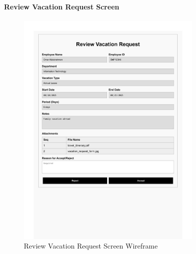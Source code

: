 \documentclass[12pt,a4paper]{article}
\begin{document}
\paragraph{Review Vacation Request Screen}
\begin{figure}[H]
\centering
\includegraphics[width=0.8\textwidth]{Wireframes/Review-Vacation-Request/Review-Vacation-Request-1.png}
\caption{Review Vacation Request Screen Wireframe}
\label{fig:wireframe-review-vacation}
\end{figure}
\end{document}
